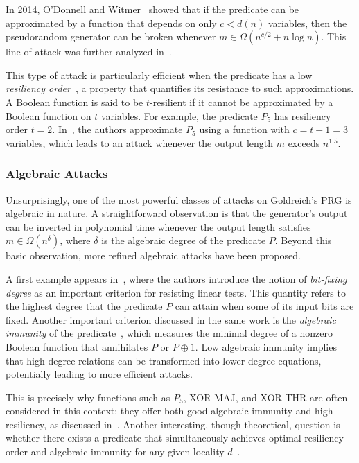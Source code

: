 \documentclass[journal=tosc,submission]{iacrtrans}
\theoremstyle{theorem}
\newcommand\yr[1]{\textcolor{brown!80}{\textbf{Yann:} #1}}
\begin{document}
In 2014, O'Donnell and Witmer~\cite{DBLP:conf/coco/ODonnellW14} showed that if the predicate can be approximated by a function that depends on only $c < d(n)$ variables, then the pseudorandom generator can be broken whenever $m \in \Omega(n^{c/2} + n \log n)$. This line of attack was further analyzed in~\cite{EPRINT:Applebaum15}.

This type of attack is particularly efficient when the predicate has a low \emph{resiliency order}~\cite{DBLP:journals/tit/Siegenthaler84}, a property that quantifies its resistance to such approximations. A Boolean function is said to be $t$-resilient if  it cannot be approximated by a Boolean function on $t$ variables. For example, the predicate $P_5$ has resiliency order $t = 2$. In~\cite{DBLP:conf/coco/ODonnellW14}, the authors approximate $P_5$ using a function with $c = t + 1 = 3$ variables, which leads to an attack whenever the output length $m$ exceeds $n^{1.5}$.


\subsubsection{Algebraic Attacks}

Unsurprisingly, one of the most powerful classes of attacks on Goldreich's PRG is algebraic in nature. A straightforward observation is that the generator's output can be inverted in polynomial time whenever the output length satisfies $m \in \Omega(n^{\delta})$, where  $\delta$ is the algebraic degree of the predicate $P$. Beyond this basic observation, more refined algebraic attacks have been proposed.

A first example appears in~\cite{STOC:AppLov16}, where the authors introduce the notion of \emph{bit-fixing degree} as an important criterion for resisting linear tests. This quantity refers to the highest degree that the predicate $P$ can attain when some of its input bits are fixed. Another important criterion discussed in the same work is the \emph{algebraic immunity} of the predicate~\cite{C:Courtois03,EC:CouMei03}, which measures the minimal degree of a nonzero Boolean function that annihilates $P$ or $P \oplus 1$. Low algebraic immunity implies that high-degree relations can be transformed into lower-degree equations, potentially leading to more efficient attacks.

This is precisely why functions such as \( P_5 \), \textsf{XOR-MAJ}, and \textsf{XOR-THR} are often considered in this context: they offer both good algebraic immunity and high resiliency, as discussed in~\cite{DBLP:journals/ccds/Meaux21, DBLP:journals/dam/Meaux22}. Another interesting, though theoretical, question is whether there exists a predicate that simultaneously achieves optimal resiliency order and algebraic immunity for any given locality $d$~\cite{DBLP:journals/dcc/DupinMR23}.
\end{document}
